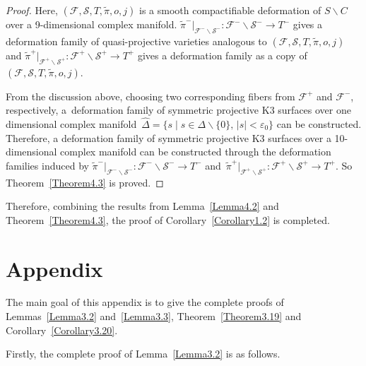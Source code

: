 \documentclass[pdftex]{sigma}
\numberwithin{equation}{section}
\begin{document}
\begin{proof}
Here, $(\mathcal{F},\mathcal{S},T,\widetilde{\pi},o,j)$ is a smooth compactifiable deformation of $S \backslash C$ over a 9-di\-men\-sion\-al complex manifold. $\widetilde{\pi}^-|_{\mathcal{F}^-\backslash \mathcal{S}^-}\colon {\mathcal{F}^-\backslash \mathcal{S}^-} \rightarrow T^-$ gives a deformation family of quasi-projective varieties analogous to $(\mathcal{F},\mathcal{S},T,\widetilde{\pi},o,j)$ and $\widetilde{\pi}^+|_{\mathcal{F}^+\backslash \mathcal{S}^+}\colon{\mathcal{F}^+\backslash \mathcal{S}^+} \rightarrow T^+$ gives a deformation family as a copy of $(\mathcal{F},\mathcal{S},T,\widetilde{\pi},o,j)$.

From the discussion above, choosing two corresponding fibers from $\mathcal{F}^+$ and $\mathcal{F}^-$, respectively, a~deformation family of symmetric projective K3 surfaces over one dimensional complex manifold~$\hat{\Delta}=\{ s\mid s \in \Delta \backslash \{ 0 \}, \, |s|<\varepsilon_0 \}$ can be constructed. Therefore, a deformation family of symmetric projective K3 surfaces over a 10-dimensional complex manifold can be constructed through the deformation families induced by $\widetilde{\pi}^-|_{\mathcal{F}^-\backslash \mathcal{S}^-}\colon{\mathcal{F}^-\backslash \mathcal{S}^-} \rightarrow T^-$ and~$\widetilde{\pi}^+|_{\mathcal{F}^+\backslash \mathcal{S}^+}\colon{\mathcal{F}^+\backslash \mathcal{S}^+} \rightarrow T^+$. So Theorem~\ref{Theorem4.3} is proved.
\end{proof}

Therefore, combining the results from Lemma~\ref{Lemma4.2} and Theorem~\ref{Theorem4.3}, the proof of Corollary~\ref{Corollary1.2} is completed.

\appendix

\section{Appendix}\label{appendixA}

The main goal of this appendix is to give the complete proofs of Lemmas~\ref{Lemma3.2} and~\ref{Lemma3.3}, Theorem~\ref{Theorem3.19} and Corollary~\ref{Corollary3.20}.

Firstly, the complete proof of Lemma~\ref{Lemma3.2} is as follows.
\end{document}
